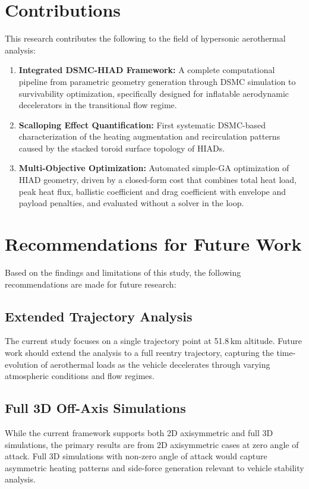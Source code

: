 \section{Contributions}
This research contributes the following to the field of hypersonic aerothermal analysis:
\begin{enumerate}
    \item \textbf{Integrated DSMC-HIAD Framework:} A complete computational pipeline from parametric geometry generation through DSMC simulation to survivability optimization, specifically designed for inflatable aerodynamic decelerators in the transitional flow regime.

    \item \textbf{Scalloping Effect Quantification:} First systematic DSMC-based characterization of the heating augmentation and recirculation patterns caused by the stacked toroid surface topology of HIADs.


    \item \textbf{Multi-Objective Optimization:} Automated simple-GA optimization of HIAD geometry, driven by a closed-form cost that combines total heat load, peak heat flux, ballistic coefficient and drag coefficient with envelope and payload penalties, and evaluated without a solver in the loop.
\end{enumerate}

\section{Recommendations for Future Work}
Based on the findings and limitations of this study, the following recommendations are made for future research:

\subsection{Extended Trajectory Analysis}
The current study focuses on a single trajectory point at 51.8\,km altitude. Future work should extend the analysis to a full reentry trajectory, capturing the time-evolution of aerothermal loads as the vehicle decelerates through varying atmospheric conditions and flow regimes.

\subsection{Full 3D Off-Axis Simulations}
While the current framework supports both 2D axisymmetric and full 3D simulations, the primary results are from 2D axisymmetric cases at zero angle of attack. Full 3D simulations with non-zero angle of attack would capture asymmetric heating patterns and side-force generation relevant to vehicle stability analysis.

